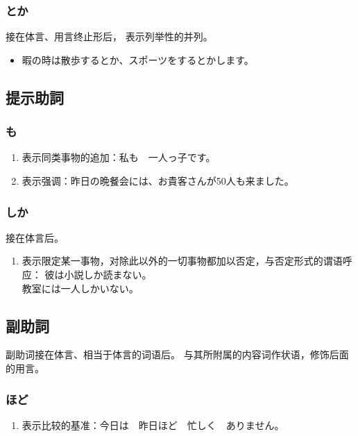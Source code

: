 \subsubsection{とか}%

接在体言、用言终止形后，
表示列举性的并列。
\begin{itemize}
  \item 暇の時は散歩するとか、スポーツをするとかします。
\end{itemize}


\subsection{提示助詞}%

\subsubsection{も}%

\begin{enumerate}
  \item 表示同类事物的追加：私も　一人っ子です。
  \item 表示强调：昨日の晩餐会には、お貴客さんが50人も来ました。
\end{enumerate}


\subsubsection{しか}%

接在体言后。
\begin{enumerate}
  \item 表示限定某一事物，对除此以外的一切事物都加以否定，与否定形式的谓语呼应：
    彼は小説しか読まない。\\
    教室には一人しかいない。
\end{enumerate}


\subsection{副助詞}%

副助词接在体言、相当于体言的词语后。
与其所附属的内容词作状语，修饰后面的用言。


\subsubsection{ほど}%

\begin{enumerate}
  \item 表示比较的基准：今日は　昨日ほど　忙しく　ありません。
\end{enumerate}


